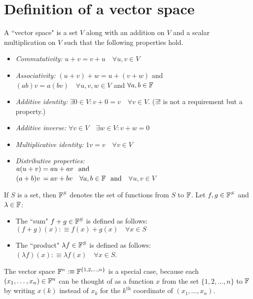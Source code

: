 \section{Definition of a vector space}

\setcounter{thm}{19}
\begin{mydef} 
  A ``vector space" is a set $V$ along with an addition on $V$ and a scalar multiplication on $V$ such that the following properties hold.
  \begin{itemize}
    \item \emph{Commutativity:}
    $ u+v = v+u \quad \forall u,v \in V$
    \item \emph{Associativity:}
    $(u+v)+w=u+(v+w)$ and $(ab)v=a(bv) \quad \forall u,v,w \in V$ and $\forall a,b \in \mathbb{F}$
    \item \emph{Additive identity:}
    $\exists 0\in V:v+0=v \quad \forall v\in V$. ($\exists!$ is not a requirement but a property.)
    \item \emph{Additive inverse:}
    $\forall v\in V \quad \exists w\in V: v+w=0$
    \item \emph{Multiplicative identity:}
    $1v = v \quad \forall v\in V$
    \item \emph{Distributive properties:}\\
    $a(u+v) = au+av \;\;\, \text{and}\;\;$  \\
    $(a+b)v \, = av + bv \quad \forall a,b \in \mathbb{F} \;\;\, \text{and}\;\;$
    $\forall u,v \in V$
  \end{itemize}
\end{mydef}

\setcounter{thm}{23}
\begin{mydef} 
  If $S$ is a set, then $\mathbb{F}^S$ denotes the set of functions from $S$ to $\mathbb{F}$. Let $f, g \in \mathbb{F}^{S}$ and $\lambda \in \mathbb{F}$:
  \begin{itemize}
    \item The ``sum" $f+g \in \mathbb{F}^{S}$ is defined as follows: $(f+g)(x) :\equiv f(x)+ g(x) \quad \forall x\in S$
    \item The ``product" $\lambda f \in \mathbb{F}^{S}$ is defined as follows: $(\lambda f)(x) :\equiv \lambda f(x) \quad \forall x \in S$.
  \end{itemize}
  The vector space $\mathbb{F}^{n} :\equiv \mathbb{F}^{\{1,2,\dots,n\}}$ is a special case, because each $(x_1, \dots, x_n) \in \mathbb{F}^{n}$ can be thought of as a function $x$ from the set $\{1, 2, \dots, n\}$ to $\mathbb{F}$ by writing $x(k)$ instead of $x_k$ for the $k^{\text{th}}$ coordinate of $(x_1, \dots, x_n)$.
\end{mydef}

